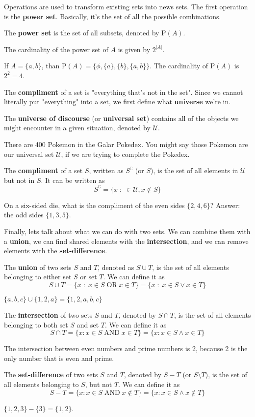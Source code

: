 Operations are used to transform existing sets into news sets.  The first operation is the {\bf power set}. Basically, it's the set of all the possible combinations.

\mydefine
{
	The {\bf power set} is the set of all subsets, denoted by $\text{P}(A)$.
}

\myproposition
{
	The cardinality of the power set of $A$ is given by $2^{|A|}$.
}

\myexample
{
	If $A=\{a,b\}$, than $\text{P}(A) = \{\phi,\{a\},\{b\},\{a,b\}\}$. The cardinality of $\text{P}(A)$ is $2^{2}=4$.
}

The {\bf compliment} of a set is "everything that's not in the set". Since we cannot literally put "everything" into a set, we first define what {\bf universe} we're in. 

\mydefine
{
	The {\bf universe of discourse} (or {\bf universal set}) contains all of the objects we might encounter in a given situation, denoted by $\mathcal{U}$.
}

\myexample
{
	There are 400 Pokemon in the Galar Pokedex. You might say those Pokemon are our universal set $\mathcal{U}$, if we are trying to complete the Pokedex.
}

\mydefine
{
	The {\bf compliment} of a set $S$, written as $S^\complement$ (or $\overline{S}$), is the set of all elements in $\mathcal{U}$ but not in $S$. It can be written as
	\[
		S^\complement = \{x \;:\; \in \mathcal{U}, x \notin S\}
	\]
}

\myexample
{
	On a six-sided die, what is the compliment of the even sides $\{2,4,6\}$? Answer: the odd sides $\{1,3,5\}$.
}

Finally, lets talk about what we can do with two sets. We can combine them with a {\bf union}, we can find shared elements with the {\bf intersection}, and we can remove elements with the {\bf set-difference}.

\mydefine
{
	The {\bf union} of two sets $S$ and $T$, denoted as $S \cup T$, is the set of all elements belonging to either set $S$ or set $T$. We can define it as
	\[
		S \cup T = \{x \;:\; x \in S \;\text{OR}\; x \in T \} = \{x \;:\; x \in S \vee x \in T \}
	\]
}

\myexample
{
	$\{a,b,c\} \cup \{1,2,a\} = \{1,2,a,b,c\}$
}

\mydefine
{
	The {\bf intersection} of two sets $S$ and $T$, denoted by $S\cap T$, is the set of all elements belonging to both set $S$ and set $T$. We can define it as
	\[
		S \cap T = \{ x : x \in S \;\text{AND}\; x \in T\} = \{ x : x \in S \wedge x \in T\}
	\]
}

\myexample
{
	The intersection between even numbers and prime numbers is ${2}$, because 2 is the only number that is even and prime.
}

\mydefine
{
	The {\bf set-difference} of two sets $S$ and $T$, denoted by $S-T$ (or $S \setminus T$), is the set of all elements belonging to $S$, but not $T$. We can define it as
	\[
		S-T = \{x : x \in S \;\text{AND}\; x \notin T\} = \{x : x \in S \wedge x \notin T\}
	\]
}

\myexample
{
	$\{1,2,3\} - \{3\} = \{1,2\}$.
}
